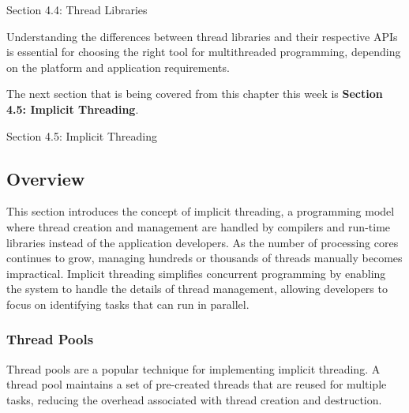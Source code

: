 \begin{notes}{Section 4.4: Thread Libraries}
\begin{highlight}
    Understanding the differences between thread libraries and their respective APIs is essential for choosing the right tool for multithreaded programming, depending on the platform and application requirements.
    
    \end{highlight}
\end{notes}

The next section that is being covered from this chapter this week is \textbf{Section 4.5: Implicit Threading}.

\begin{notes}{Section 4.5: Implicit Threading}
    \subsection*{Overview}

    This section introduces the concept of implicit threading, a programming model where thread creation and management are handled by compilers and run-time libraries instead of the application developers. 
    As the number of processing cores continues to grow, managing hundreds or thousands of threads manually becomes impractical. Implicit threading simplifies concurrent programming by enabling the 
    system to handle the details of thread management, allowing developers to focus on identifying tasks that can run in parallel.
    
    \subsubsection*{Thread Pools}
    
    Thread pools are a popular technique for implementing implicit threading. A thread pool maintains a set of pre-created threads that are reused for multiple tasks, reducing the overhead associated 
    with thread creation and destruction.
    
    \begin{highlight}
    

\end{highlight}
\end{notes}
